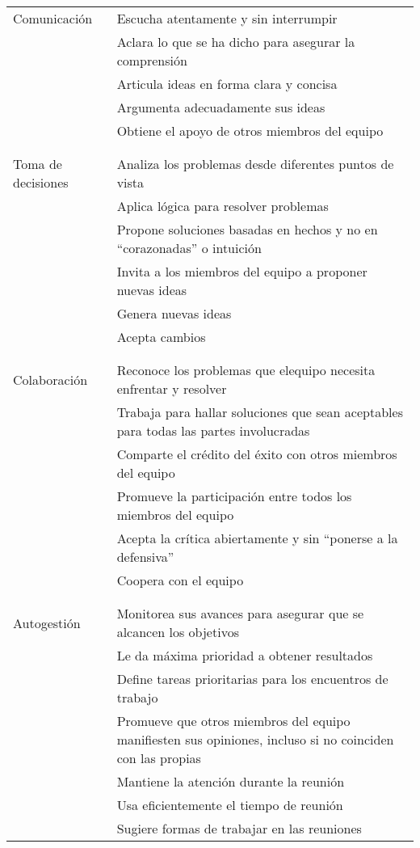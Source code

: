 \noindent
\begin{longtable}{p{}p{}}

  Comunicación
  & Escucha atentamente y sin interrumpir \\
  & Aclara lo que se ha dicho para asegurar la comprensión \\
  & Articula ideas en forma clara y concisa \\
  & Argumenta adecuadamente sus ideas \\
  & Obtiene el apoyo de otros miembros del equipo \\
  \\ [-1.5ex] \hline \\ [-1.5ex]

  Toma de decisiones
  & Analiza los problemas desde diferentes puntos de vista \\
  & Aplica lógica para resolver problemas \\
  & Propone soluciones basadas en hechos y no en ``corazonadas'' o intuición \\
  & Invita a los miembros del equipo a proponer nuevas ideas \\
  & Genera nuevas ideas \\
  & Acepta cambios \\
  \\ [-1.5ex] \hline \\ [-1.5ex]

  Colaboración
  & Reconoce los problemas que elequipo necesita enfrentar y resolver \\
  & Trabaja para hallar soluciones que sean aceptables para todas las partes involucradas \\
  & Comparte el crédito del éxito con otros miembros del equipo \\
  & Promueve la participación entre todos los miembros del equipo \\
  & Acepta la crítica abiertamente y sin ``ponerse a la defensiva'' \\
  & Coopera con el equipo \\
  \\ [-1.5ex] \hline \\ [-1.5ex]

  Autogestión
  & Monitorea sus avances para asegurar que se alcancen los objetivos \\
  & Le da máxima prioridad a obtener resultados \\
  & Define tareas prioritarias para los encuentros de trabajo \\
  & Promueve que otros miembros del equipo manifiesten sus opiniones, incluso si no coinciden con las propias \\
  & Mantiene la atención durante la reunión \\
  & Usa eficientemente el tiempo de reunión \\
  & Sugiere formas de trabajar en las reuniones \\

\end{longtable}

